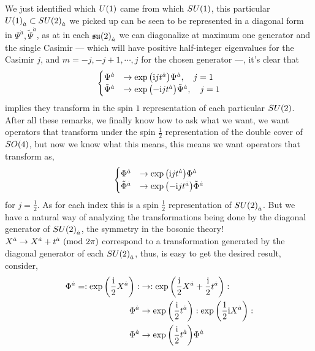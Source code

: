 We just identified which $U\qty(1)$ came from which $SU\qty(1)$, this particular $U\qty(1)_{\dot a}\subset SU\qty(2)_{\dot a}$ we picked up 
can be seen to be represented in a diagonal form in $\Psi^{\dot a},{\tilde\Psi}^{\dot a}$, as at in each $\mathfrak{su}\qty(2)_{\dot a}$ we 
can diagonalize at maximum one generator and the single Casimir --- which will have positive half-integer eigenvalues for the Casimir $j$, 
and $m=-j,-j+1,\cdots,j$ for the chosen generator ---, it's clear that 
\begin{align*}
    \begin{cases}
        \Psi^{\dot a}&\rightarrow\exp\qty(\textnormal{i} j t^{\dot a})\Psi^{\dot a},\ \ \ j=1\\
        {\tilde\Psi}^{\dot a}&\rightarrow\exp\qty(-\textnormal{i} j t^{\dot a}){\tilde\Psi}^{\dot a},\ \ \ j=1
    \end{cases}
\end{align*}
implies they transform in the spin $1$ representation of each particular $SU\qty(2)$. After all these remarks, 
we finally know how to ask what we want, we want operators that transform under the spin $\frac12$ representation 
of the double cover of $SO\qty(4)$, but now we know what this means, this means we want operators that transform as,
\begin{align*}
    \begin{cases}
        \Phi^{\dot a}&\rightarrow\exp\qty(\textnormal{i} j t^{\dot a})\Phi^{\dot a}\\
        {\tilde\Phi}^{\dot a}&\rightarrow\exp\qty(-\textnormal{i} j t^{\dot a}){\tilde\Phi}^{\dot a}
    \end{cases}
\end{align*}
for $j=\frac12$. As for each index this is a spin $\frac12$ representation of $SU\qty(2)_{\dot a}$. But we have a natural way of 
analyzing the transformations being done by the diagonal generator of $SU\qty(2)_{\dot a}$, the symmetry in the bosonic theory! 
$X^{\dot a}\rightarrow X^{\dot a}+t^{\dot a}\ \qty(\textnormal{mod }2\pi)$ correspond to a transformation generated by the diagonal 
generator of each $SU\qty(2)_{\dot a}$, thus, is easy to get the desired result, consider,
\begin{align*}
    \Phi^{\dot a}=:\exp\qty(\frac{\textnormal{i}}2 X^{\dot a}):&\rightarrow:\exp\qty(\frac{\textnormal{i}}2 X^{\dot a}+\frac{\textnormal{i}}2 t^{\dot a}):\\
    \Phi^{\dot a}&\rightarrow\exp\qty(\frac{\textnormal{i}}2 t^{\dot a}):\exp\qty(\frac12\textnormal{i} X^{\dot a}):\\
    \Phi^{\dot a}&\rightarrow\exp\qty(\frac{\textnormal{i}}2 t^{\dot a})\Phi^{\dot a}
\end{align*}
